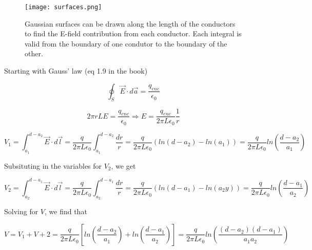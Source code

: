 \begin{figure}[h]
  \begin{center}

    \texttt{[image: surfaces.png]}

    \caption{Gaussian surfaces can be drawn along the length of the
      conductors to find the E-field contribution from each conductor.
      Each integral is valid from the boundary of one condutor to the
      boundary of the other.}

    \label{fig::1::7::gauss}

  \end{center}
\end{figure}


Starting with Gauss' law (eq 1.9 in the book)

\begin{equation}
  \oint_S \vec{E} \cdot d\vec{a} = \frac{q_{enc}}{\epsilon_0}
\end{equation}

\begin{equation}
  \label{eq::1::7::e}
  2 \pi r L E = \frac{q_{enc}}{\epsilon_0}
  \Rightarrow E = \frac{q_{enc}}{2 \pi L \epsilon_0} \frac 1 r
\end{equation}

\begin{equation}
  \label{eq::1::7::v1}
  V_1 = \int_{a_1}^{d-a_2}{\vec{E} \cdot d\vec{l}}
  = \frac{q}{2 \pi L \epsilon_0} \int_{a_1}^{d-a_2}{\frac{dr}{r}}
  = \frac{q}{2 \pi L \epsilon_0} \left( ln(d-a_2) - ln(a_1)\right)
  = \frac{q}{2 \pi L \epsilon_0} ln\left( \frac{d-a_2}{a_1} \right)
\end{equation}

Subsituting in the variables for $V_2$, we get

\begin{equation}
  \label{eq::1::7::v2}
  V_2 = \int_{a_2}^{d-a_1}{\vec{E} \cdot d\vec{l}}
  = \frac{q}{2 \pi L \epsilon_0} \int_{a_2}^{d-a_1}{\frac{dr}{r}}
  = \frac{q}{2 \pi L \epsilon_0} \left( ln(d-a_1) - ln(a_2y)\right)
  = \frac{q}{2 \pi L \epsilon_0} ln\left( \frac{d-a_1}{a_2} \right)
\end{equation}

Solving for $V$, we find that

\begin{equation}
  V = V_1 + V+2
  = \frac{q}{2 \pi L \epsilon_0} \left[ ln\left( \frac{d-a_2}{a_1} \right) + ln\left( \frac{d-a_1}{a_2} \right) \right]
  = \frac{q}{2 \pi L \epsilon_0} ln\left( \frac{(d-a_2)(d-a_1)}{a_1a_2} \right)
\end{equation}

